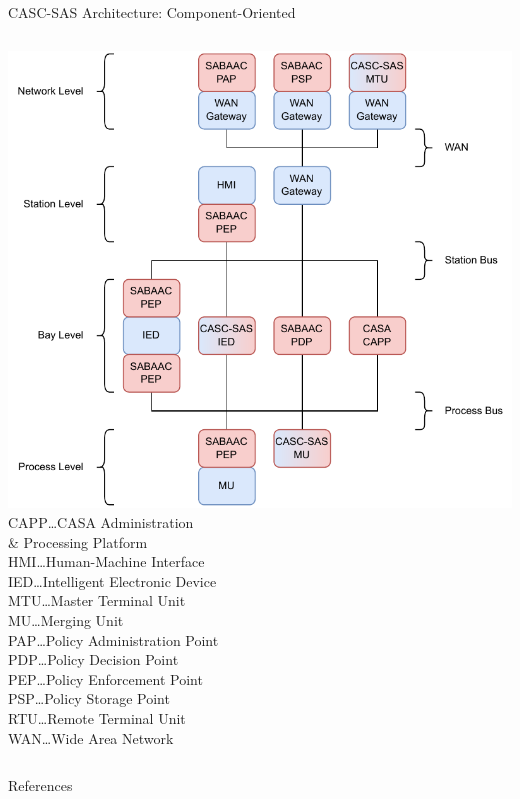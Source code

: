 \documentclass[en]{sdqbeamer}
\begin{document}
\begin{frame}{CASC-SAS Architecture: Component-Oriented}
    \begin{columns}
        \centering
        \includegraphics[height=0.75\textheight]{./figures/casc_architecture_color.drawio.pdf}
        \footnotesize
        CAPP\dots CASA Administration\\\qquad\qquad\& Processing Platform\\HMI\dots Human-Machine Interface\\IED\dots Intelligent Electronic Device\\MTU\dots Master Terminal Unit\\MU\dots Merging Unit\\PAP\dots Policy Administration Point\\PDP\dots Policy Decision Point\\PEP\dots Policy Enforcement Point\\PSP\dots Policy Storage Point\\RTU\dots Remote Terminal Unit\\WAN\dots Wide Area Network
    \end{columns}
\end{frame}

\begin{frame}[allowframebreaks]{References}
\printbibliography
\end{frame}

\backupend
\end{document}
